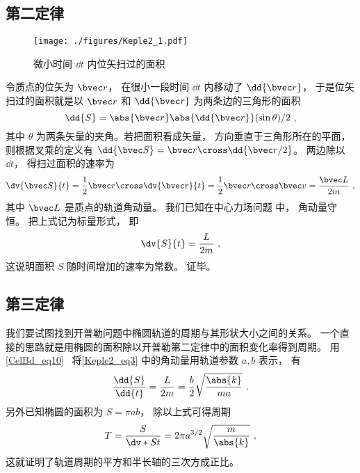 

\subsection{第二定律}
\begin{figure}[ht]
\centering
\texttt{[image: ./figures/Keple2\_1.pdf]}
\caption{微小时间 $\dd{t}$ 内位矢扫过的面积} \label{Keple2_fig1}
\end{figure}

令质点的位矢为 $\bvec r$，  在很小一段时间 $\dd{t}$ 内移动了 $\dd{\bvec r}$，  于是位矢扫过的面积就是以 $\bvec r$ 和 $\dd{\bvec r}$ 为两条边的三角形的面积
\begin{equation}
\dd{S} = \abs{\bvec r} \abs{\dd{\bvec r}} (\sin \theta) /2~,
\end{equation}
其中 $\theta$ 为两条矢量的夹角。若把面积看成矢量， 方向垂直于三角形所在的平面， 则根据叉乘的定义有 $\dd{\bvec S} = \bvec r \cross \dd{\bvec r/2}$。 两边除以 $\dd{t}$，  得扫过面积的速率为
\begin{equation}
\dv{\bvec S}{t} = \frac12 \bvec r \cross \dv{\bvec r}{t} = \frac12 \bvec r\cross \bvec v = \frac{\bvec L}{2m}~,
\end{equation}
其中 $\bvec L$ 是质点的轨道角动量。 我们已知在中心力场问题 中， 角动量守恒。 把上式记为标量形式， 即
\begin{equation}\label{Keple2_eq3}
\dv{S}{t} = \frac{L}{2m}~,
\end{equation}
这说明面积 $S$ 随时间增加的速率为常数。 证毕。

\subsection{第三定律}
我们要试图找到开普勒问题中椭圆轨道的周期与其形状大小之间的关系。 一个直接的思路就是用椭圆的面积除以开普勒第二定律中的面积变化率得到周期。 用\autoref{CelBd_eq10}~ 将\autoref{Keple2_eq3} 中的角动量用轨道参数 $a,b$ 表示， 有
\begin{equation}
\frac{\dd{S}}{\dd{t}} = \frac{L}{2m} = \frac b2 \sqrt{\frac{\abs{k}}{ma}}~.
\end{equation}
另外已知椭圆的面积为 $S = \pi ab$， 除以上式可得周期
\begin{equation}\label{Keple2_eq1}
T = \frac{S}{\dv*{S}{t}} = 2\pi a^{3/2} \sqrt{\frac{m}{\abs{k}}}~,
\end{equation}
这就证明了轨道周期的平方和半长轴的三次方成正比。